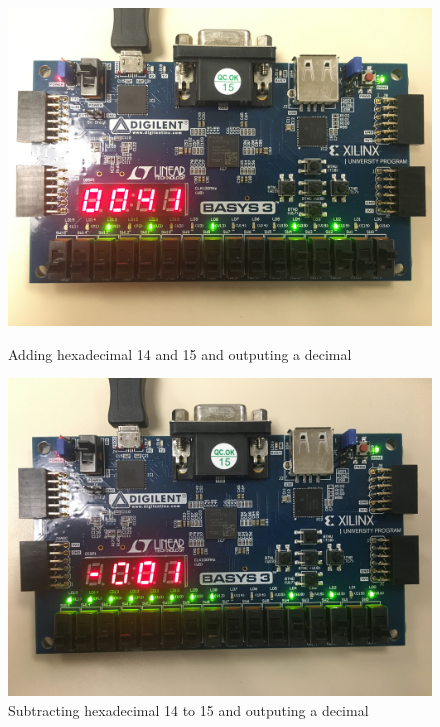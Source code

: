\documentclass[11pt]{article}
\begin{document}
\begin{figure}[ht]
	\centering
	\includegraphics[width=12cm]{"board/pos"}
	\caption{Adding hexadecimal 14 and 15 and outputing a decimal}
	\includegraphics[width=12cm]{"board/neg"}
	\caption{Subtracting hexadecimal 14 to 15 and outputing a decimal}
\end{figure}
\end{document}
